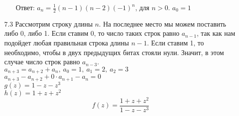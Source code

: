 \documentclass[10pt]{article}
\begin{document}
\begin{enumerate}
\begin{enumerate}
		Ответ: $a_n = \frac{1}{2} (n-1)(n-2)(-1)^n$, для $n>0$.
				$a_0 = 1$
	\end{enumerate}
	
	\item[7.3] Рассмотрим строку длины $n$. На последнее место мы можем поставить либо 0, либо 1. Если ставим 0, то число таких строк равно $a_{n-1}$, так как нам подойдет любая правильная строка длины $n-1$. Если ставим 1, то необходимо, чтобы в двух предыдущих битах стояли нули. Значит, в этом случае число строк равно $a_{n-3}$.\\
	$a_{n+3} = a_{n+2} + a_{n},\ a_0=1,\ a_1 = 2,\ a_2 = 3$\\
	$a_{n+3} - a_{n+2} +0\cdot a_{n+1} - a_{n} = 0$\\
	$g(z) = 1 - z - z^3$\\
	$h(z) = 1 + z +z^2$
	$$f(z) = \frac{1+z+z^2}{1-z-z^3}$$
\end{enumerate}
\end{document}

